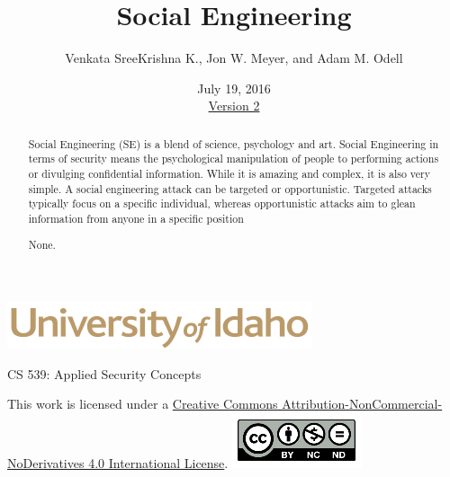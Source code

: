 \documentclass[12pt]{extarticle}
\begin{document}
\title{ Social Engineering \\ \large}
\author{Venkata SreeKrishna K., Jon W. Meyer, and Adam M. Odell}
\date{July 19, 2016 \\ \hyperref[changelog]{Version 2}} %
\renewcommand{\abstractname}{Executive Summary}
\begin{titlepage}
\maketitle
{}
\begin{center}
\includegraphics[scale=.5]{UofI}

\large{CS 539: Applied Security Concepts}

\vskip 40pt

\end{center}
\begin{abstract}
Social Engineering (SE) is a blend of science, psychology and art. Social Engineering in terms of security means the psychological manipulation of people to performing actions or divulging confidential information. While it is amazing and complex, it is also very simple. A social engineering attack can be targeted or opportunistic. Targeted attacks typically focus on a specific individual, whereas opportunistic attacks aim to glean information from anyone in a specific position


None.
\end{abstract}


\vfill
\begin{center}
This work is licensed under a \href{https://creativecommons.org/licenses/by-nc-nd/2.0/}{Creative Commons Attribution-NonCommercial-NoDerivatives 4.0 International License}.
\vskip 10pt
\includegraphics[scale=.5]{cc}
\end{center}

\end{titlepage}


\pagebreak
\tableofcontents
\end{document}
